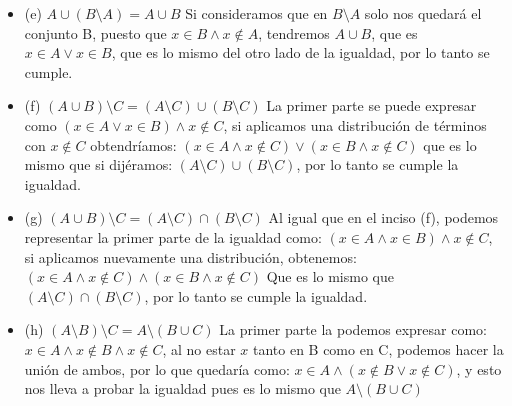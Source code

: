 \begin{itemize}
	\item (e) $A \cup (B \setminus A) = A \cup B$\newline
	Si consideramos que en $B \setminus A $ solo nos quedará el conjunto B, puesto que $x \in B \wedge x \notin A$, tendremos $A \cup B$, que es $x \in A \lor x \in B$, que es lo mismo del otro lado de la igualdad, por lo tanto se cumple. 
	
	\item (f) $(A \cup B )\setminus C = (A \setminus C ) \cup (B \setminus C)$\newline
	La primer parte se puede expresar como $(x \in A \lor x \in B) \wedge x \notin C$, si aplicamos una distribución de términos con $x \notin C$ obtendríamos:\newline
	$(x \in A \wedge x \notin C) \lor (x \in B \wedge x \notin C)$ que es lo mismo que si dijéramos: \newline
	$(A \setminus C ) \cup (B \setminus C)$, por lo tanto se cumple la igualdad.
	
	\item (g) $(A \cup B )\setminus C = (A \setminus C) \cap (B \setminus C) $\newline
	Al igual que en el inciso (f), podemos representar la primer parte de la igualdad como:\newline
	$(x \in A \wedge x \in B) \wedge x \notin C$, si aplicamos nuevamente una distribución, obtenemos:\newline
	$(x \in A \wedge x\notin C) \wedge (x \in B \wedge x\notin C)$\newline
	Que es lo mismo que $(A \setminus C) \cap (B \setminus C) $, por lo tanto se cumple la igualdad.
	
	\item (h) $(A \setminus B) \setminus C = A \setminus (B \cup C)$\newline
	La primer parte la podemos expresar como:\newline
	$x \in A \wedge x\notin B \wedge x \notin C $, al no estar $x$ tanto en B como en C, podemos hacer la unión de ambos, por lo que quedaría como:\newline
	$x \in A \wedge (x \notin B \lor x  \notin C)$, y esto nos lleva a probar la igualdad pues es lo mismo que $A \setminus (B \cup C)$
	

\end{itemize}
